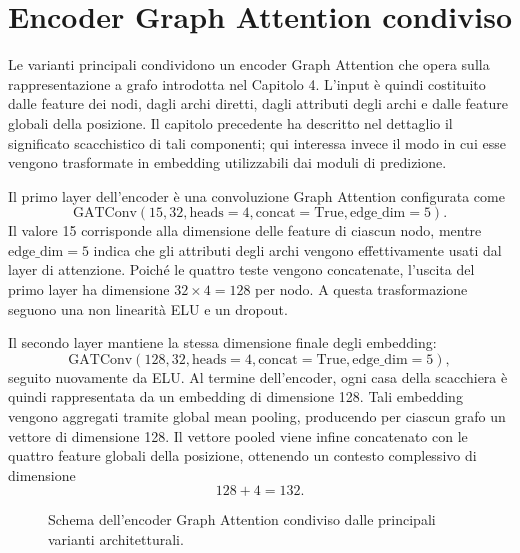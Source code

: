 \section{Encoder Graph Attention condiviso}

Le varianti principali condividono un encoder Graph Attention che opera sulla rappresentazione a grafo introdotta nel Capitolo 4. L'input \`e quindi costituito dalle feature dei nodi, dagli archi diretti, dagli attributi degli archi e dalle feature globali della posizione. Il capitolo precedente ha descritto nel dettaglio il significato scacchistico di tali componenti; qui interessa invece il modo in cui esse vengono trasformate in embedding utilizzabili dai moduli di predizione.

Il primo layer dell'encoder \`e una convoluzione Graph Attention configurata come
\[
    \mathrm{GATConv}(15, 32, \mathrm{heads}=4, \mathrm{concat}=\mathrm{True}, \mathrm{edge\_dim}=5).
\]
Il valore 15 corrisponde alla dimensione delle feature di ciascun nodo, mentre \(\mathrm{edge\_dim}=5\) indica che gli attributi degli archi vengono effettivamente usati dal layer di attenzione. Poich\'e le quattro teste vengono concatenate, l'uscita del primo layer ha dimensione \(32 \times 4 = 128\) per nodo. A questa trasformazione seguono una non linearit\`a ELU e un dropout.

Il secondo layer mantiene la stessa dimensione finale degli embedding:
\[
    \mathrm{GATConv}(128, 32, \mathrm{heads}=4, \mathrm{concat}=\mathrm{True}, \mathrm{edge\_dim}=5),
\]
seguito nuovamente da ELU. Al termine dell'encoder, ogni casa della scacchiera \`e quindi rappresentata da un embedding di dimensione 128. Tali embedding vengono aggregati tramite global mean pooling, producendo per ciascun grafo un vettore di dimensione 128. Il vettore pooled viene infine concatenato con le quattro feature globali della posizione, ottenendo un contesto complessivo di dimensione
\[
    128 + 4 = 132.
\]

\begin{figure}[htbp]
    \centering
    \caption{Schema dell'encoder Graph Attention condiviso dalle principali varianti architetturali.}
    \label{fig:shared-gat-encoder}
\end{figure}


